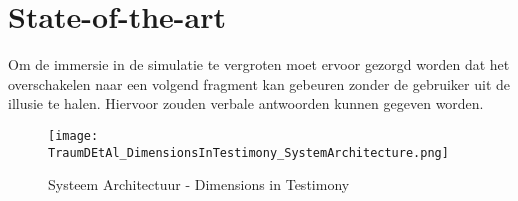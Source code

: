 %
%
%
%
%


\section{State-of-the-art}%
\label{sec:state-of-the-art}

Om de immersie in de simulatie te vergroten moet ervoor gezorgd worden dat het overschakelen naar een volgend fragment kan gebeuren zonder de gebruiker uit de illusie te halen. Hiervoor zouden verbale antwoorden kunnen gegeven worden.

\begin{figure}[h]
    \texttt{[image: TraumDEtAl\_DimensionsInTestimony\_SystemArchitecture.png]}
    \caption{Systeem Architectuur - Dimensions in Testimony \autocite{Traum2015}}
    \label{fig:DiTArchitecture}
\end{figure}


